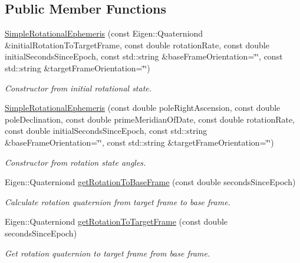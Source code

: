 \subsection*{Public Member Functions}
\begin{DoxyCompactItemize}
\item 
\hyperlink{classtudat_1_1ephemerides_1_1SimpleRotationalEphemeris_a077afdab1f051d85c8ba5f785f0e96c6}{Simple\+Rotational\+Ephemeris} (const Eigen\+::\+Quaterniond \&initial\+Rotation\+To\+Target\+Frame, const double rotation\+Rate, const double initial\+Seconds\+Since\+Epoch, const std\+::string \&base\+Frame\+Orientation=\char`\"{}\char`\"{}, const std\+::string \&target\+Frame\+Orientation=\char`\"{}\char`\"{})
\begin{DoxyCompactList}\small\item\em Constructor from initial rotational state. \end{DoxyCompactList}\item 
\hyperlink{classtudat_1_1ephemerides_1_1SimpleRotationalEphemeris_ae725cb0e7c9ae2003b7aaa8d73364463}{Simple\+Rotational\+Ephemeris} (const double pole\+Right\+Ascension, const double pole\+Declination, const double prime\+Meridian\+Of\+Date, const double rotation\+Rate, const double initial\+Seconds\+Since\+Epoch, const std\+::string \&base\+Frame\+Orientation=\char`\"{}\char`\"{}, const std\+::string \&target\+Frame\+Orientation=\char`\"{}\char`\"{})
\begin{DoxyCompactList}\small\item\em Constructor from rotation state angles. \end{DoxyCompactList}\item 
Eigen\+::\+Quaterniond \hyperlink{classtudat_1_1ephemerides_1_1SimpleRotationalEphemeris_a2d8ba0d2ff99412fe30a1446ab39cf44}{get\+Rotation\+To\+Base\+Frame} (const double seconds\+Since\+Epoch)
\begin{DoxyCompactList}\small\item\em Calculate rotation quaternion from target frame to base frame. \end{DoxyCompactList}\item 
Eigen\+::\+Quaterniond \hyperlink{classtudat_1_1ephemerides_1_1SimpleRotationalEphemeris_a7c1ec7c84f042ab174556727f052f927}{get\+Rotation\+To\+Target\+Frame} (const double seconds\+Since\+Epoch)
\begin{DoxyCompactList}\small\item\em Get rotation quaternion to target frame from base frame. \end{DoxyCompactList}\item 

\end{DoxyCompactItemize}
